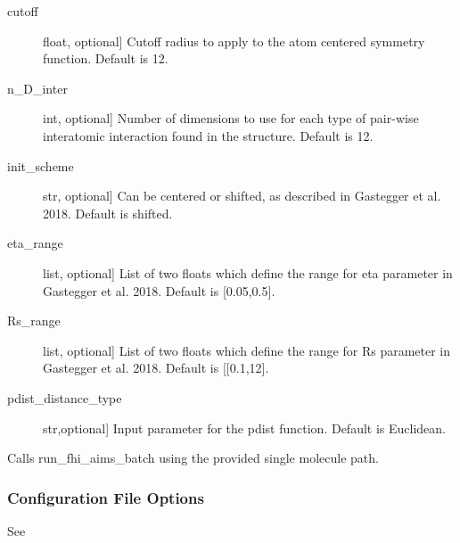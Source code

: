\documentclass[letterpaper,10pt,english]{sphinxmanual}
\begin{document}
\begin{fulllineitems}
\begin{fulllineitems}
\begin{description}
\item[{cutoff}] \leavevmode{[}float, optional{]}
Cutoff radius to apply to the atom centered symmetry function.
Default is 12.

\item[{n\_D\_inter}] \leavevmode{[}int, optional{]}
Number of dimensions to use for each type of pair-wise
interatomic interaction found in the structure. Default is 12.

\item[{init\_scheme}] \leavevmode{[}str, optional{]}
Can be centered or shifted, as described in Gastegger et al. 2018.
Default is shifted.

\item[{eta\_range}] \leavevmode{[}list, optional{]}
List of two floats which define the range for eta parameter in
Gastegger et al. 2018. Default is {[}0.05,0.5{]}.

\item[{Rs\_range}] \leavevmode{[}list, optional{]}
List of two floats which define the range for Rs parameter in
Gastegger et al. 2018. Default is {[}{[}0.1,12{]}.

\item[{pdist\_distance\_type}] \leavevmode{[}str,optional{]}
Input parameter for the pdist function. Default is Euclidean.

\end{description}

\end{fulllineitems}


\begin{fulllineitems}
\label{\detokenize{index:Genarris.genarris_master.Genarris.Relax_Single_Molecule}}
Calls run\_fhi\_aims\_batch using the provided single molecule path.
\subsubsection*{Configuration File Options}

See {\hyperref[\detokenize{index:Genarris.genarris_master.Genarris.Run_FHI_Aims_Batch}]{}}


\end{fulllineitems}
\end{fulllineitems}
\end{document}
